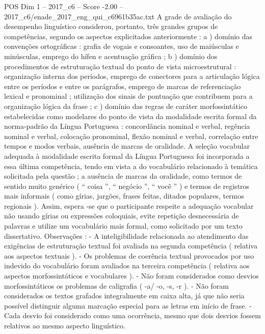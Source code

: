 \begin{textsample}{POS Dim 1 – 2017\_c6 – Score -2.00 – 2017\_c6/enade\_2017\_eng\_qui\_c6961b35ac.txt}
A grade de avaliação do desempenho linguístico considerou, portanto, três grandes grupos de competências, segundo os aspectos explicitados anteriormente : a ) domínio das convenções ortográficas : grafia de vogais e consoantes, uso de maiúsculas e minúsculas, emprego do hífen e acentuação gráfica ; b ) domínio dos procedimentos de estruturação textual do ponto de vista microestrutural : organização interna dos períodos, emprego de conectores para a articulação lógica entre os períodos e entre os parágrafos, emprego de marcas de referenciação lexical e pronominal ; utilização dos sinais de pontuação que contribuem para a organização lógica da frase ; c ) domínio das regras de caráter morfossintático estabelecidas como modelares do ponto de vista da modalidade escrita formal da norma-padrão da Língua Portuguesa : concordância nominal e verbal, regência nominal e verbal, colocação pronominal, flexão nominal e verbal, correlação entre tempos e modos verbais, ausência de marcas de oralidade.
A seleção vocabular adequada à modalidade escrita formal da Língua Portuguesa foi incorporada a essa última competência, tendo em vista a do vocabulário relacionado à temática solicitada pela questão ; a ausência de marcas da oralidade, como termos de sentido muito genérico ( “ coisa ”, “ negócio ”, “ você ” ) e termos de registros mais informais ( como gírias, jargões, frases feitas, ditados populares, termos regionais ).
Assim, espera -se que o participante respeite a adequação vocabular não usando gírias ou expressões coloquiais, evite repetição desnecessária de palavras e utilize um vocabulário mais formal, como solicitado por um texto dissertativo.
Observações : - A inteligibilidade relacionada ao atendimento das exigências de estruturação textual foi avaliada na segunda competência ( relativa aos aspectos textuais ). - Os problemas de coerência textual provocados por uso indevido do vocabulário foram avaliados na terceira competência ( relativa aos aspectos morfossintáticos e vocabulares ). - Não foram considerados como desvios morfossintáticos os problemas de caligrafia ( -a/ -o, -s, -r ). - Não foram considerados os textos grafados integralmente em caixa alta, já que não seria possível distinguir alguma marcação especial para as letras em início de frase. - Cada desvio foi considerado como uma ocorrência, mesmo que dois desvios fossem relativos ao mesmo aspecto linguístico.

\end{textsample}

